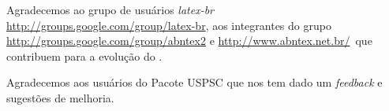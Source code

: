 \begin{agradecimentos}
	Agradecemos ao grupo de usuários
	\emph{latex-br}  {\url{http://groups.google.com/group/latex-br}}, aos integrantes do grupo
	\emph{\abnTeX}  {\url{http://groups.google.com/group/abntex2}  e \url{http://www.abntex.net.br/}}~que contribuem para a evolução do \abnTeX.
	
	Agradecemos aos usuários do Pacote USPSC que nos tem dado um \textit{feedback} e sugestões de melhoria. 
	
\end{agradecimentos}
